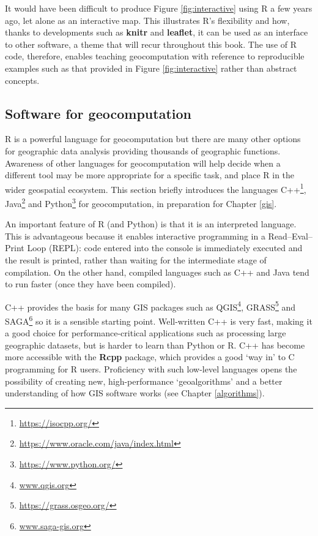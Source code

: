 \documentclass[]{krantz}
\let\rmarkdownfootnote\footnote%
\def\footnote{\protect\rmarkdownfootnote}
\renewcommand{\href}[2]{#2\footnote{\url{#1}}}
\begin{document}
It would have been difficult to produce Figure \ref{fig:interactive} using R a few years ago, let alone as an interactive map.
This illustrates R's flexibility and how, thanks to developments such as \textbf{knitr} and \textbf{leaflet}, it can be used as an interface to other software, a theme that will recur throughout this book.
The use of R code, therefore, enables teaching geocomputation with reference to reproducible examples such as that provided in Figure \ref{fig:interactive} rather than abstract concepts.

\hypertarget{software-for-geocomputation}{%
\subsection{Software for geocomputation}\label{software-for-geocomputation}}

R is a powerful language for geocomputation but there are many other options for geographic data analysis providing thousands of geographic functions.
Awareness of other languages for geocomputation will help decide when a different tool may be more appropriate for a specific task, and place R in the wider geospatial ecosystem.
This section briefly introduces the languages \href{https://isocpp.org/}{C++}, \href{https://www.oracle.com/java/index.html}{Java} and \href{https://www.python.org/}{Python} for geocomputation, in preparation for Chapter \ref{gis}.

An important feature of R (and Python) is that it is an interpreted language.
This is advantageous because it enables interactive programming in a Read--Eval--Print Loop (REPL):
code entered into the console is immediately executed and the result is printed, rather than waiting for the intermediate stage of compilation.
On the other hand, compiled languages such as C++ and Java tend to run faster (once they have been compiled).

C++ provides the basis for many GIS packages such as \href{www.qgis.org}{QGIS}, \href{https://grass.osgeo.org/}{GRASS} and \href{www.saga-gis.org}{SAGA} so it is a sensible starting point.
Well-written C++ is very fast, making it a good choice for performance-critical applications such as processing large geographic datasets, but is harder to learn than Python or R.
C++ has become more accessible with the \textbf{Rcpp} package, which provides a good `way in' to C programming for R users.
Proficiency with such low-level languages opens the possibility of creating new, high-performance `geoalgorithms' and a better understanding of how GIS software works (see Chapter \ref{algorithms}).
\end{document}
